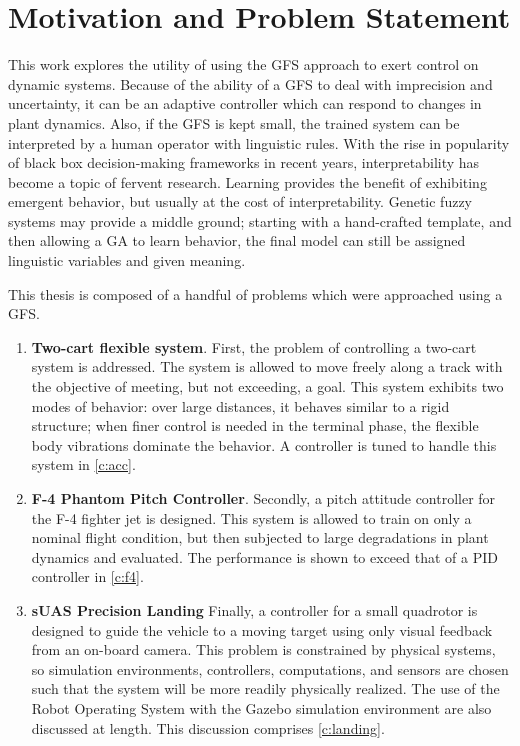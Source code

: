\section{Motivation and Problem Statement}
This work explores the utility of using the GFS approach to exert control on dynamic systems. Because of the
ability of a GFS to deal with imprecision and uncertainty, it can be an adaptive controller which can respond
to changes in plant dynamics. Also, if the GFS is kept small, the trained system can be interpreted by a human
operator with linguistic rules. With the rise in popularity of black box decision-making frameworks in recent
years, interpretability has become a topic of fervent
research\cite{ribeiro2016should,lipton2016mythos,zeiler2014visualizing,dong2017improving}. Learning provides
the benefit of exhibiting emergent behavior, but usually at the cost of interpretability. Genetic fuzzy
systems may provide a middle ground; starting with a hand-crafted template, and then allowing a GA to learn
behavior, the final model can still be assigned linguistic variables and given meaning. 

This thesis is composed of a handful of problems which were approached using a GFS.
\begin{enumerate}
    \item {\bf Two-cart flexible system}. First, the problem of controlling a two-cart system is addressed.
        The system is allowed to move freely along a track with the objective of meeting, but not exceeding, a
        goal. This system exhibits two modes of behavior: over large distances, it behaves similar to a rigid
        structure; when finer control is needed in the terminal phase, the flexible body vibrations dominate
        the behavior. A controller is tuned to handle this system in \cref{c:acc}.

    \item {\bf F-4 Phantom Pitch Controller}. Secondly, a pitch attitude controller for the F-4 fighter jet is
        designed. This system is allowed to train on only a nominal flight condition, but then subjected to
        large degradations in plant dynamics and evaluated. The performance is shown to exceed that of a PID
        controller in \cref{c:f4}.

    \item {\bf sUAS Precision Landing} Finally, a controller for a small quadrotor is designed to guide the
        vehicle to a moving target using only visual feedback from an on-board camera. This problem is
        constrained by physical systems, so simulation environments, controllers, computations, and sensors
        are chosen such that the system will be more readily physically realized. The use of the Robot Operating
        System with the Gazebo simulation environment are also discussed at length. This discussion comprises
        \cref{c:landing}.
\end{enumerate}


